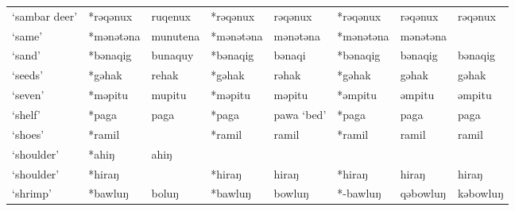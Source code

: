 \begin{landscape}
\begin{longtable}[c]{@{}p{3cm}<{\raggedright}p{2.75cm}<{\raggedright}p{2.75cm}<{\raggedright}p{2.75cm}<{\raggedright}p{2.75cm}<{\raggedright}p{2.75cm}<{\raggedright}p{2.75cm}<{\raggedright}p{2.75cm}<{\raggedright}@{}}
`sambar deer'                                        & *rəqənux     & ruqenux                       & *rəqənux       & rəqənux                    & *rəqənux         & rəqənux                  & rəqənux                           \\
`same'                                               & *mənətəna    & munutena                      & *mənətəna      & mənətəna                   & *mənətəna        & mənətəna                 &                                   \\
`sand'                                               & *bənaqig     & bunaquy                       & *bənaqig       & bənaqi                     & *bənaqig         & bənaqig                  & bənaqig                           \\
`seeds'                                              & *gəhak       & rehak                         & *gəhak         & rəhak                      & *gəhak           & gəhak                    & gəhak                             \\
`seven'                                              & *məpitu      & mupitu                        & *məpitu        & məpitu                     & *əmpitu          & əmpitu                   & əmpitu                            \\
`shelf'                                              & *paga        & paga                          & *paga          & pawa `bed'                 & *paga            & paga                     & paga                              \\
`shoes'                                              & *ramil       &                               & *ramil         & ramil                      & *ramil           & ramil                    & ramil                             \\
`shoulder'                                           & *ahiŋ        & ahiŋ                          &                &                            &                  &                          &                                   \\
`shoulder'                                           & *hiraŋ       &                               & *hiraŋ         & hiraŋ                      & *hiraŋ           & hiraŋ                    & hiraŋ                             \\
`shrimp'                                             & *bawluŋ      & boluŋ                         & *bawluŋ        & bowluŋ                     & *-bawluŋ         & qəbowluŋ                 & kəbowluŋ                          \\

\end{longtable}
\end{landscape}

